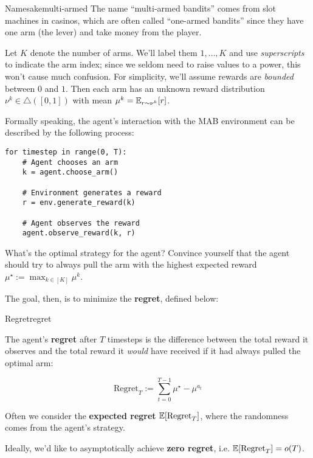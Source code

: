 \documentclass[../main/main]{subfiles}
\begin{document}
\begin{remark}{Namesake}{multi-armed}
    The name ``multi-armed bandits'' comes from slot machines in casinos, which are often called ``one-armed bandits'' since they have one arm (the lever) and take money from the player.
\end{remark}

Let $K$ denote the number of arms. We'll label them $1, \dots, K$ and use \emph{superscripts} to indicate the arm index; since we seldom need to raise values to a power, this won't cause much confusion. For simplicity, we'll assume rewards are \emph{bounded} between $0$ and $1$. Then each arm has an unknown reward distribution $\nu^k \in \triangle([0, 1])$ with mean $\mu^k = \operatorname*{\mathbb{E}}_{r \sim \nu^k} [r]$.

Formally speaking, the agent's interaction with the MAB environment can be described by the following process:

\begin{lstlisting}
for timestep in range(0, T):
    # Agent chooses an arm
    k = agent.choose_arm()
    
    # Environment generates a reward
    r = env.generate_reward(k)
    
    # Agent observes the reward
    agent.observe_reward(k, r)
\end{lstlisting}

What's the optimal strategy for the agent? Convince yourself that the agent should try to always pull the arm with the highest expected reward $\mu^\star := \max_{k \in [K]} \mu^k$.

The goal, then, is to minimize the \textbf{regret}, defined below:

\begin{definition}{Regret}{regret}
    
The agent's \textbf{regret} after $T$ timesteps is the difference between the total reward it observes and the total reward it \emph{would} have received if it had always pulled the optimal arm:

\begin{equation}
    \text{Regret}_T := \sum_{t=0}^{T-1} \mu^\star - \mu^{a_t}
\end{equation}

Often we consider the \textbf{expected regret} $\operatorname*{\mathbb{E}}[\text{Regret}_T]$, where the randomness comes from the agent's strategy.

\end{definition}

Ideally, we'd like to asymptotically achieve \textbf{zero regret}, i.e. $\operatorname*{\mathbb{E}}[\text{Regret}_T] = o(T)$.
\end{document}
